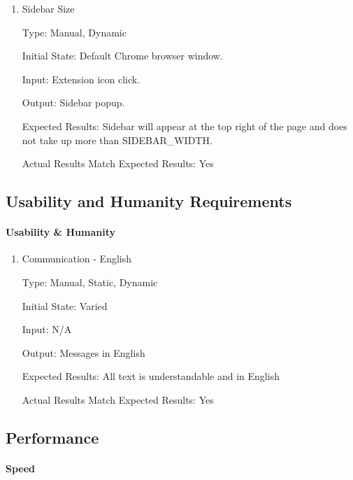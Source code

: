 \documentclass[12pt, titlepage]{article}
\begin{document}
\begin{enumerate}
	
	\item{Sidebar Size\\}
	
	Type: Manual, Dynamic
	
	Initial State: Default Chrome browser window.
	
	Input: Extension icon click.
	
	Output: Sidebar popup.
	
	Expected Results: Sidebar will appear at the top right of the page and does 
	not take up more than SIDEBAR\_WIDTH.
	
	Actual Results Match Expected Results: Yes	
	
\end{enumerate}

\subsection{Usability and Humanity Requirements}

\paragraph{Usability \& Humanity}

\begin{enumerate}
	
	\item{Communication - English\\}
	
	Type: Manual, Static, Dynamic
	
	Initial State: Varied
	
	Input: N/A
	
	Output: Messages in English
	
	Expected Results: All text is understandable and in English
	
	Actual Results Match Expected Results: Yes 
	
\end{enumerate}

\subsection{Performance}

\paragraph{Speed}
\end{document}
